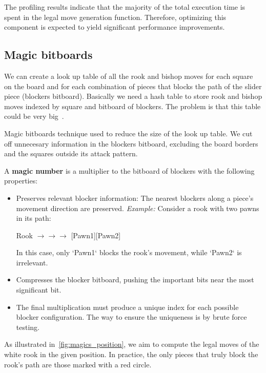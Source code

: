 \noindent The profiling results indicate that the majority of the total execution time is spent in the legal move generation function. Therefore, optimizing this component is expected to yield significant performance improvements.

\subsection{Magic bitboards}

We can create a look up table of all the rook and bishop moves for each square on the board and for each combination of pieces that blocks the path of the slider piece (blockers  bitboard). Basically we need a hash table to store rook and bishop moves indexed by square and bitboard of blockers. The problem is that this table could be very big~\cite{MagicBitboards}.

\vspace{1em}

\noindent Magic bitboards technique used to reduce the size of the look up table. We cut off unnecesary information in the blockers bitboard, excluding the board borders and the squares outside its attack pattern.

\vspace{1em}

\noindent A \textbf{magic number} is a multiplier to the bitboard of blockers with the following properties:

\begin{itemize}[itemsep=1pt]
  \item Preserves relevant blocker information: 
  The nearest blockers along a piece's movement direction are preserved. 
  \textit{Example:} Consider a rook with two pawns in its path:
  \begin{center}
    Rook $\rightarrow \rightarrow \rightarrow$ [Pawn1][Pawn2]
  \end{center}
  In this case, only `Pawn1` blocks the rook's movement, while `Pawn2` is irrelevant.
  \item Compresses the blocker bitboard, pushing the important bits near the most significant bit.
  \item The final multiplication must produce a unique index for each possible blocker configuration. The way to ensure the uniqueness is by brute force testing.
\end{itemize}

\noindent As illustrated in~\cref{fig:magics_position}, we aim to compute the legal moves of the white rook in the given position. In practice, the only pieces that truly block the rook's path are those marked with a red circle.

